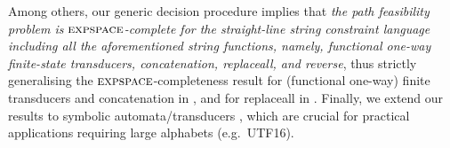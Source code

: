 Among others, our generic decision procedure implies that \emph{the path feasibility problem is $\textsc{expspace}$-complete for the straight-line string constraint language including all the aforementioned string functions, namely, functional one-way finite-state transducers, concatenation, replaceall, and reverse}, thus strictly generalising the $\textsc{expspace}$-completeness result for (functional one-way) finite transducers and concatenation in \cite{LB16}, and
for replaceall in \cite{CCHLW18}.
%
Finally, we extend our results to symbolic automata/transducers
\cite{BEK,symbolic-transducer,DV13,symbolic-transducer-power}, which are crucial for practical 
applications requiring large alphabets (e.g.~UTF16).

%


